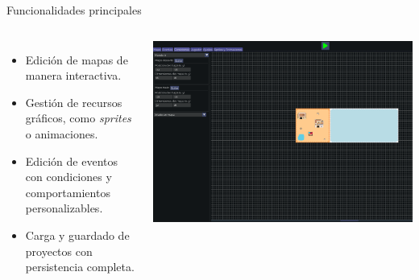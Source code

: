 \documentclass[aspectratio=169]{beamer}
\begin{document}
\begin{frame}{Funcionalidades principales}
	\begin{columns}
			\begin{itemize}
				\item Edición de mapas de manera interactiva.
				\item Gestión de recursos gráficos, como \textit{sprites} o animaciones.
				\item Edición de eventos con condiciones y comportamientos personalizables.
				\item Carga y guardado de proyectos con persistencia completa.
			\end{itemize}
			\includegraphics[width=\textwidth]{imgs/editor/conexiones.pdf}
	\end{columns}
\end{frame}
\end{document}
